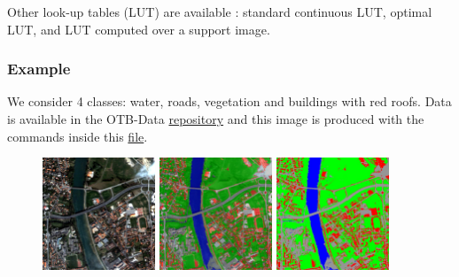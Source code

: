 Other look-up tables (LUT) are available : standard continuous LUT,
optimal LUT, and LUT computed over a support image.

\subsubsection{Example}

We consider 4 classes: water, roads, vegetation and buildings with red roofs.
Data is available in the OTB-Data
\href{http://hg.orfeo-toolbox.org/OTB-Data/file/0fed8f4f035c/Input/Classification}{repository}
and this image is produced with the commands inside this
\href{http://hg.orfeo-toolbox.org/OTB-Applications/file/3ce975605013/Testing/Classification/CMakeLists.txt}{file}.

\begin{figure}[!h]
  \center
  \includegraphics[width=0.3\textwidth]{../Art/MonteverdiImages/classification_chain_inputimage.jpg}
  \includegraphics[width=0.3\textwidth]{../Art/MonteverdiImages/classification_chain_fancyclassif_fusion.jpg}
  \includegraphics[width=0.3\textwidth]{../Art/MonteverdiImages/classification_chain_fancyclassif.jpg}
  \label{fig:MeanShiftVectorImageFilter}
\end{figure}




